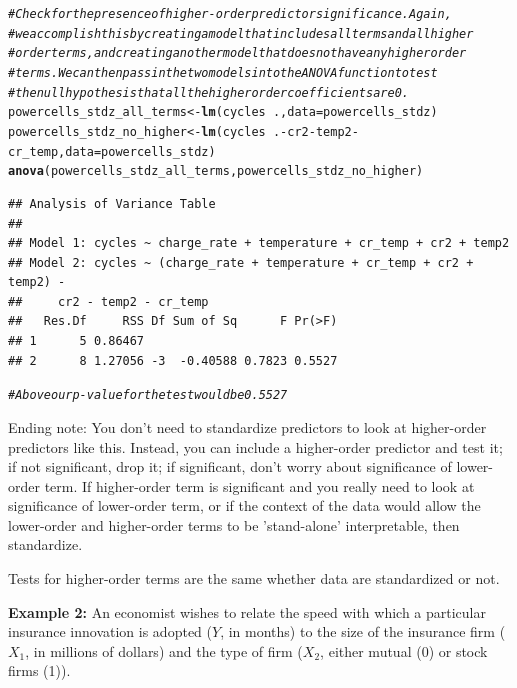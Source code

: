 \documentclass{article}\usepackage[]{graphicx}\usepackage[]{color}
\makeatletter
\newcommand{\hlcom}[1]{\textcolor[rgb]{0.678,0.584,0.686}{\textit{#1}}}%
\newcommand{\hlopt}[1]{\textcolor[rgb]{0,0,0}{#1}}%
\newcommand{\hlstd}[1]{\textcolor[rgb]{0.345,0.345,0.345}{#1}}%
\newcommand{\hlkwb}[1]{\textcolor[rgb]{0.69,0.353,0.396}{#1}}%
\newcommand{\hlkwc}[1]{\textcolor[rgb]{0.333,0.667,0.333}{#1}}%
\newcommand{\hlkwd}[1]{\textcolor[rgb]{0.737,0.353,0.396}{\textbf{#1}}}%
\newenvironment{kframe}{%
 \def\at@end@of@kframe{}%
 \ifinner\ifhmode%
  \def\at@end@of@kframe{\end{minipage}}%
  \begin{minipage}{\columnwidth}%
 \fi\fi%
 \def\FrameCommand##1{\hskip\@totalleftmargin \hskip-\fboxsep
 \colorbox{shadecolor}{##1}\hskip-\fboxsep
     \hskip-\linewidth \hskip-\@totalleftmargin \hskip\columnwidth}%
 \MakeFramed {\advance\hsize-\width
   \@totalleftmargin\z@ \linewidth\hsize
   \@setminipage}}%
 {\par\unskip\endMakeFramed%
 \at@end@of@kframe}
\newenvironment{knitrout}{}{} %
\makeatother
\begin{document}
\begin{knitrout}
\begin{kframe}
\begin{alltt}
\hlcom{# Check for the presence of higher-order predictor significance. Again,}
\hlcom{# we accomplish this by creating a model that includes all terms and all higher}
\hlcom{# order terms, and creating another model that does not have any higher order}
\hlcom{# terms. We can then pass in the two models into the ANOVA function to test}
\hlcom{# the null hypothesis that all the higher order coefficients are 0.}
\hlstd{powercells_stdz_all_terms} \hlkwb{<-} \hlkwd{lm}\hlstd{(cycles} \hlopt{~} \hlstd{.,} \hlkwc{data} \hlstd{= powercells_stdz)}
\hlstd{powercells_stdz_no_higher} \hlkwb{<-} \hlkwd{lm}\hlstd{(cycles} \hlopt{~} \hlstd{.} \hlopt{-}\hlstd{cr2} \hlopt{-}\hlstd{temp2} \hlopt{-}\hlstd{cr_temp,} \hlkwc{data} \hlstd{= powercells_stdz)}
\hlkwd{anova}\hlstd{(powercells_stdz_all_terms, powercells_stdz_no_higher)}
\end{alltt}
\begin{verbatim}
## Analysis of Variance Table
## 
## Model 1: cycles ~ charge_rate + temperature + cr_temp + cr2 + temp2
## Model 2: cycles ~ (charge_rate + temperature + cr_temp + cr2 + temp2) - 
##     cr2 - temp2 - cr_temp
##   Res.Df     RSS Df Sum of Sq      F Pr(>F)
## 1      5 0.86467                           
## 2      8 1.27056 -3  -0.40588 0.7823 0.5527
\end{verbatim}
\begin{alltt}
\hlcom{# Above our p-value for the test would be 0.5527}
\end{alltt}
\end{kframe}
\end{knitrout}

Ending note: You don't need to standardize predictors to look at higher-order predictors like this. Instead, you can include a higher-order predictor and test it; if not significant, drop it; if significant, don't worry about significance of lower-order term. If higher-order term is significant and you really need to look at significance of lower-order term, or if the context of the data would allow the lower-order and higher-order terms to be 'stand-alone' interpretable, then standardize.

Tests for higher-order terms are the same whether data are standardized or not.

\newpage

\textbf{Example 2:} An economist wishes to relate the speed with which a particular insurance innovation is adopted ($Y$, in months) to the size of the insurance firm ($X_1$, in millions of dollars) and the type of firm ($X_2$, either mutual (0) or stock firms (1)).
\end{document}
